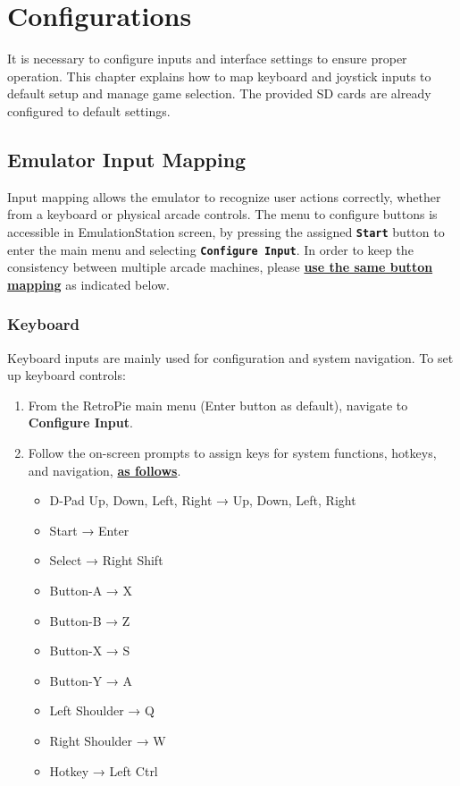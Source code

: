 \chapter{Configurations}
\label{cha:configurations}

It is necessary to configure inputs and interface settings to ensure proper operation. This chapter explains how to map keyboard and joystick inputs to default setup and manage game selection. The provided SD cards are already configured to default settings.

\section{Emulator Input Mapping}
\label{sec:input_mapping}

Input mapping allows the emulator to recognize user actions correctly, whether from a keyboard or physical arcade controls. The menu to configure buttons is accessible in EmulationStation screen, by pressing the assigned \textbf{\texttt{Start}} button to enter the main menu and selecting \textbf{\texttt{Configure Input}}. In order to keep the consistency between multiple arcade machines, please \underline{\textbf{use the same button mapping}} as indicated below.

\subsection{Keyboard}
\label{subsec:keyboard}

Keyboard inputs are mainly used for configuration and system navigation. To set up keyboard controls:

\begin{enumerate}
  \item From the RetroPie main menu (Enter button as default), navigate to \textbf{Configure Input}.
  \item Follow the on-screen prompts to assign keys for system functions, hotkeys, and navigation, \textbf{\underline{as follows}}.
    \begin{itemize}
      \item D-Pad Up, Down, Left, Right → Up, Down, Left, Right
      \item Start → Enter
      \item Select → Right Shift
      \item Button-A → X
      \item Button-B → Z
      \item Button-X → S
      \item Button-Y → A
      \item Left Shoulder → Q
      \item Right Shoulder → W
      \item Hotkey → Left Ctrl
    \end{itemize}
\end{enumerate}

